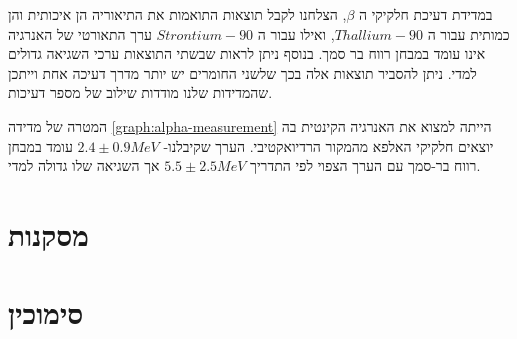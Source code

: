 \documentclass{article}
\begin{document}
במדידת דעיכת חלקיקי ה
$\beta$,
הצלחנו לקבל תוצאות התואמות את התיאוריה הן איכותית והן כמותית עבור ה
$Thallium-90$,
ואילו עבור ה
$Strontium-90$
ערך התאורטי של האנרגיה אינו עומד במבחן רווח בר סמך.
בנוסף ניתן לראות שבשתי התוצאות ערכי השגיאה גדולים למדי.
ניתן להסביר תוצאות אלה בכך שלשני החומרים יש יותר מדרך דעיכה אחת וייתכן שהמדידות שלנו מודדות שילוב של מספר דעיכות.

המטרה של מדידה
\ref{graph:alpha-measurement}
הייתה למצוא את האנרגיה הקינטית בה יוצאים חלקיקי האלפא מהמקור הרדיואקטיבי. הערך שקיבלנו-
$2.4 \pm 0.9 MeV$
עומד במבחן רווח בר-סמך עם הערך הצפוי לפי התדריך
$5.5\pm2.5 MeV$
אך השגיאה שלו גדולה למדי.

\section{
מסקנות
}

\section*{
סימוכין
}

\begin{english}
\printbibliography[heading=none]
\end{english}
\end{document}
